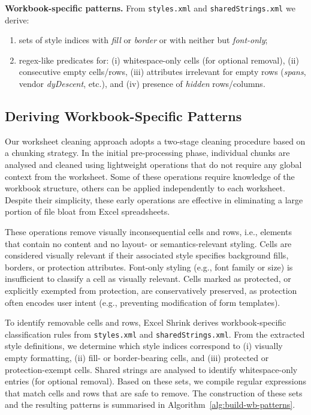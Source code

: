\documentclass[conference]{IEEEtran}
\begin{document}
\noindent \textbf{Workbook-specific patterns.}
From \texttt{styles.xml} and \texttt{sharedStrings.xml} we derive:
\begin{enumerate}
\item sets of style indices with \emph{fill} or \emph{border} or with neither but \emph{font-only};
\item regex-like predicates for: (i) whitespace-only cells (for optional removal), (ii) consecutive empty cells/rows, (iii) attributes irrelevant for empty rows (\emph{spans}, vendor \emph{dyDescent}, etc.), and (iv) presence of \emph{hidden} rows/columns.
\end{enumerate}





\subsection{Deriving Workbook-Specific Patterns}
\label{sec:wb-patterns}


Our worksheet cleaning approach adopts a two-stage cleaning procedure based on a chunking strategy.
In the initial pre-processing phase, individual chunks are analysed
and cleaned using lightweight operations that do not require any global context
from the worksheet. Some of these operations require knowledge of the workbook structure,
others can be applied independently to each worksheet. Despite their simplicity,
these early operations are effective in eliminating a large portion of file bloat
from Excel spreadsheets.

These operations remove visually inconsequential cells and rows,
i.e., elements that contain no content and no layout- or semantics-relevant styling.
Cells are considered visually relevant if their associated style specifies
background fills, borders, or protection attributes.
Font-only styling (e.g., font family or size) is insufficient to classify a cell
as visually relevant.
Cells marked as protected, or explicitly exempted from protection,
are conservatively preserved, as protection often encodes user intent
(e.g., preventing modification of form templates).

To identify removable cells and rows, Excel Shrink derives workbook-specific
classification rules from \texttt{styles.xml} and \texttt{sharedStrings.xml}.
From the extracted style definitions, we determine which style indices correspond to
(i) visually empty formatting, (ii) fill- or border-bearing cells, and
(iii) protected or protection-exempt cells.
Shared strings are analysed to identify whitespace-only entries
(for optional removal).
Based on these sets, we compile regular expressions that match
cells and rows that are safe to remove.
The construction of these sets and the resulting patterns
is summarised in Algorithm~\ref{alg:build-wb-patterns}.
\end{document}
